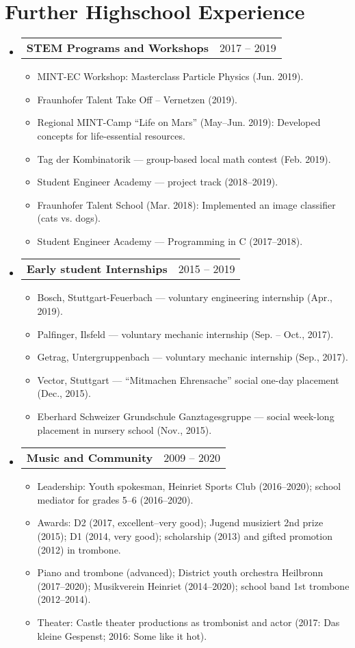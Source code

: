 \documentclass[letterpaper,11pt]{article}
\makeatletter
\newcommand{\resumeItem}[1]{
  \item\small{
    {#1 \vspace{-2pt}}
  }
}
\newcommand{\resumeProjectHeading}[2]{
    \item
    \begin{tabular*}{0.97\textwidth}{l@{\extracolsep{\fill}}r}
      \small#1 & #2 \\
    \end{tabular*}\vspace{-7pt}
}
\newcommand{\resumeSubHeadingListStart}{\begin{itemize}[leftmargin=0.15in, label={}]}
\newcommand{\resumeSubHeadingListEnd}{\end{itemize}}
\newcommand{\resumeItemListStart}{\begin{itemize}}
\newcommand{\resumeItemListEnd}{\end{itemize}\vspace{-5pt}}
\makeatother
\begin{document}
  \section{Further Highschool Experience}
    \resumeSubHeadingListStart
      \resumeProjectHeading
          {\textbf{STEM Programs and Workshops}}{2017 -- 2019}
          \resumeItemListStart
            \resumeItem{MINT-EC Workshop: Masterclass Particle Physics (Jun. 2019).}
            \resumeItem{Fraunhofer Talent Take Off – Vernetzen (2019).}
            \resumeItem{Regional MINT-Camp “Life on Mars” (May--Jun. 2019): Developed concepts for life-essential resources.}
            \resumeItem{Tag der Kombinatorik — group-based local math contest (Feb. 2019).}
            \resumeItem{Student Engineer Academy — project track (2018--2019).}
            \resumeItem{Fraunhofer Talent School (Mar. 2018): Implemented an image classifier (cats vs. dogs).}
            \resumeItem{Student Engineer Academy — Programming in C (2017--2018).}
          \resumeItemListEnd
      \resumeProjectHeading
          {\textbf{Early student Internships}}{2015 -- 2019}
          \resumeItemListStart
            \resumeItem{Bosch, Stuttgart-Feuerbach — voluntary engineering internship (Apr., 2019).}
            \resumeItem{Palfinger, Ilsfeld — voluntary mechanic internship (Sep. -- Oct., 2017).}
            \resumeItem{Getrag, Untergruppenbach — voluntary mechanic internship (Sep., 2017).}
            \resumeItem{Vector, Stuttgart — “Mitmachen Ehrensache” social one-day placement (Dec., 2015).}
            \resumeItem{Eberhard Schweizer Grundschule Ganztagesgruppe — social week-long placement in nursery school (Nov., 2015).}
          \resumeItemListEnd
      \resumeProjectHeading
            {\textbf{Music and Community}}{2009 -- 2020}
            \resumeItemListStart
            \resumeItem{Leadership: Youth spokesman, Heinriet Sports Club (2016--2020); school mediator for grades 5--6 (2016--2020).}
            \resumeItem{Awards: D2 (2017, excellent--very good); Jugend musiziert 2nd prize (2015); D1 (2014, very good); scholarship (2013) and gifted promotion (2012) in trombone.}
            \resumeItem{Piano and trombone (advanced); District youth orchestra Heilbronn (2017--2020); Musikverein Heinriet (2014--2020); school band 1st trombone (2012--2014).}
            \resumeItem{Theater: Castle theater productions as trombonist and actor (2017: Das kleine Gespenst; 2016: Some like it hot).}
            \resumeItemListEnd

    \resumeSubHeadingListEnd
\end{document}
